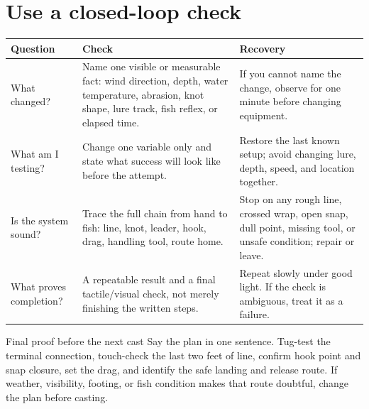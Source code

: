\section{Use a closed-loop check}
\begin{center}
\end{center}

\begin{tabularx}{\linewidth}{@{}p{.22\linewidth}LL@{}}
\toprule
\textbf{Question} & \textbf{Check} & \textbf{Recovery}\\
\midrule
What changed? & Name one visible or measurable fact: wind direction, depth,
water temperature, abrasion, knot shape, lure track, fish reflex, or elapsed
time. & If you cannot name the change, observe for one minute before changing
equipment.\\
What am I testing? & Change one variable only and state what success will look
like before the attempt. & Restore the last known setup; avoid changing lure,
depth, speed, and location together.\\
Is the system sound? & Trace the full chain from hand to fish: line, knot,
leader, hook, drag, handling tool, route home. & Stop on any rough line, crossed
wrap, open snap, dull point, missing tool, or unsafe condition; repair or leave.\\
What proves completion? & A repeatable result and a final tactile/visual check,
not merely finishing the written steps. & Repeat slowly under good light. If
the check is ambiguous, treat it as a failure.\\
\bottomrule
\end{tabularx}

\begin{telospanel}{Final proof before the next cast}
Say the plan in one sentence. Tug-test the terminal connection, touch-check the
last two feet of line, confirm hook point and snap closure, set the drag, and
identify the safe landing and release route. If weather, visibility, footing,
or fish condition makes that route doubtful, change the plan before casting.
\end{telospanel}
